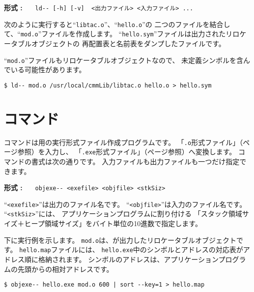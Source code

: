 \begin{flushleft}
{\bf 形式 : }~~~\verb/ld-- [-h] [-v]  <出力ファイル> <入力ファイル> .../
\end{flushleft}

次のように実行すると``\verb/libtac.o/''、``\verb/hello.o/''の
二つのファイルを結合して、``\verb/mod.o/''ファイルを作成します。
``\verb/hello.sym/''ファイルは出力されたリロケータブルオブジェクトの
再配置表と名前表をダンプしたファイルです。

``\verb/mod.o/''ファイルもリロケータブルオブジェクトなので、
未定義シンボルを含んでいる可能性があります。

\begin{mylist}
\begin{verbatim}
$ ld-- mod.o /usr/local/cmmLib/libtac.o hello.o > hello.sym
\end{verbatim}
\end{mylist}

\section{{\objexe}コマンド}

{\objexe}コマンドは{\tacos}用の実行形式ファイル作成プログラムです。
「\verb/.o/形式ファイル」（\pageref{app:oformat}ページ参照）を入力し、
「\verb/.exe/形式ファイル」（\pageref{app:eformat}ページ参照）へ変換します。
{\objbin}コマンドの書式は次の通りです。
入力ファイルも出力ファイルも一つだけ指定できます。

\begin{flushleft}
{\bf 形式 : }~~~\verb/objexe-- <exefile> <objfile> <stkSiz>/
\end{flushleft}

``\verb/<exefile>/''は出力のファイル名です。
``\verb/<objfile>/''は入力のファイル名です。
``\verb/<stkSiz>/''には、
アプリケーションプログラムに割り付ける
「スタック領域サイズ＋ヒープ領域サイズ」をバイト単位の10進数で指定します。

下に実行例を示します。
\verb/mod.o/は、\ld が出力したリロケータブルオブジェクトです。
\verb/hello.map/ファイルには、
\verb/hello.exe/中のシンボルとアドレスの対応表がアドレス順に格納されます。
シンボルのアドレスは、アプリケーションプログラムの先頭からの相対アドレスです。

\begin{mylist}
\begin{verbatim}
$ objexe-- hello.exe mod.o 600 | sort --key=1 > hello.map
\end{verbatim}
\end{mylist}

